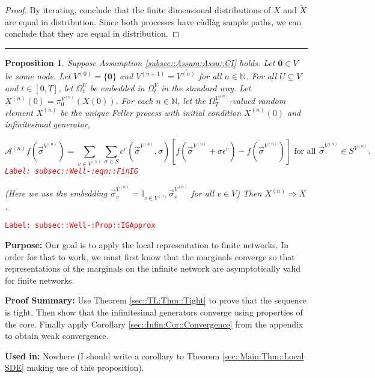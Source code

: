 \documentclass[12pt]{article}
\newcommand{\mb}{\mathbb}
\newcommand{\mc}{\mathcal}
\newcommand{\ov}{\overline}
\newcommand{\te}{\text}
\newcommand{\ep}{\epsilon}
\newcommand{\tr}{\textcolor{red}}
\newcommand{\labe}[1]{\tr{\texttt{Label: #1}}}
\newcommand{\purpose}{\textbf{Purpose: }}
\newcommand{\pfsum}{\textbf{Proof Summary: }}
\newcommand{\usein}{\textbf{Used in: }}
\newcommand{\lin}{\rule{\linewidth}{0.4 pt}}
\renewcommand{\root}{\mathbf{0}}				%
\renewcommand{\v}{v}							%
\renewcommand{\U}{U}							%
\renewcommand{\S}{S}							%
\newcommand{\s}{\sigma}							%
\newcommand{\sv}{\vec{\s}}						%
\newcommand{\ev}{\ep}							%
\newcommand{\T}{T}								%
\renewcommand{\t}{t}							%
\newcommand{\sset}{\Omega}						%
\newcommand{\proj}{\pi}							%
\newcommand{\X}{X}								%
\newcommand{\IG}{\mc{A}}						%
\newcommand{\IGr}{c}							%
\newcommand{\vind}[1]{^{#1}}					%
\newcommand{\carp}[1]{^{#1}}					%
\newcommand{\vsi}[1]{^{#1}}						%
\newcommand{\cind}[1]{_{#1}}					%
\newcommand{\cl}{\ov}							%
\newcommand{\tp}[1]{(#1)}						%
\newcommand{\ts}[1]{_{#1}}						%
\newcommand{\sln}[1]{^{(#1)}}					%
\newcommand{\alt}[1]{\widetilde{#1}}			%
\newtheorem{prop}[thms]{Proposition}
\begin{document}
\begin{proof}
By iterating, conclude that the finite dimensional distributions of \(\X\) and \(\alt{\X}\) are equal in distribution. Since both processes have c\`adl\`ag sample paths, we can conclude that they are equal in distribution.

\end{proof}

\lin

\begin{prop}
Suppose Assumption \ref{subsec::Assum:Assu::CI} holds. Let \(\root \in V\) be some node. Let \(V\sln{0} = \{\root\}\) and \(V\sln{n+1} = \cl{V\sln{n}}\) for all \(n \in \mb{N}\). For all \(\U \subseteq V\) and \(\t \in [0,\T]\), let \(\sset\vsi{\U}\ts{\t}\) be embedded in \(\sset\vsi{V}\ts{\t}\) in the standard way. Let \(\X\sln{n}\tp{0} = \proj\vsi{V\sln{n}}\ts{0}(\X\tp{0})\). For each \(n\in\mb{N}\), let the \(\sset\vsi{V\sln{n}}\ts{\T}\)-valued random element \(\X\sln{n}\) be the unique Feller process with initial condition \(\X\sln{n}\tp{0}\) and infinitesimal generator,

\begin{equation}
\IG\sln{n}f(\sv\vsi{V\sln{n}}) = \sum_{\v\in V\sln{n}}\sum_{\s\in \S} \IGr\vind{\v}(\sv\vsi{V\sln{n}}, \s)[f(\sv\vsi{V\sln{n}} + \s\ev\vind{\v}) - f(\sv\vsi{V\sln{n}})]\te{ for all } \sv\vsi{V\sln{n}} \in \S\carp{V\sln{n}}.
\label{subsec::Well-:eqn::FinIG}
\end{equation}
\labe{subsec::Well-:eqn::FinIG}

(Here we use the embedding \(\sv\cind{\v}\vsi{V\sln{n}} = \mb{I}_{\v\in V\sln{n}} \sv\cind{\v}\vsi{V\sln{n}}\) for all \(\v \in V\)) Then \(\X\sln{n} \Rightarrow \X\).
\label{subsec::Well-:Prop::IGApprox}
\end{prop}
\labe{subsec::Well-:Prop::IGApprox}

\purpose Our goal is to apply the local representation to finite networks. In order for that to work, we must first know that the marginals converge so that representations of the marginals on the infinite network are asymptotically valid for finite networks.

\pfsum Use Theorem \ref{sec::TL:Thm::Tight} to prove that the sequence is tight. Then show that the infinitesimal generators converge using properties of the core. Finally apply Corollary \ref{sec::Infin:Cor::Convergence} from the appendix to obtain weak convergence.

\usein Nowhere (I should write a corollary to Theorem \ref{sec::Main:Thm::Local SDE} making use of this proposition).
\end{document}
